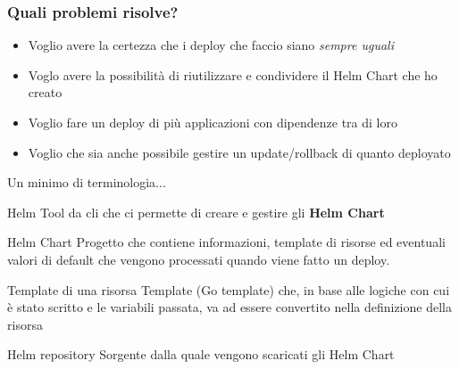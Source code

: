 \documentclass{beamer}
\begin{document}
 \begin{frame}
 \frametitle{Quali problemi risolve?}
 \begin{itemize}
     \item Voglio avere la certezza che i deploy che faccio siano \textit{sempre uguali}
     \item Voglo avere la possibilità di riutilizzare e condividere il  Helm Chart che ho creato
     \item Voglio fare un deploy di più applicazioni con dipendenze tra di loro
     \item Voglio che sia anche possibile gestire un update/rollback di quanto deployato
 \end{itemize}
 \end{frame}
 
 
 \begin{frame}[allowframebreaks]{Un minimo di terminologia...}
 
 \begin{block}{Helm}
 Tool da cli che ci permette di creare e gestire gli \textbf{Helm Chart}
 \end{block}
 \framebreak
 \begin{block}{Helm Chart}
 Progetto che contiene informazioni, template di risorse ed eventuali valori di default che vengono processati quando viene fatto un deploy.
 \end{block}
 \framebreak
 \begin{block}{Template di una risorsa}
 Template (Go template) che, in base alle logiche con cui è stato scritto e le variabili passata, va ad essere convertito nella definizione della risorsa
 \end{block}
 \framebreak
 \begin{block}{Helm repository}
 Sorgente dalla quale vengono scaricati gli Helm Chart
 \end{block}
 \end{frame}
 
\end{document}
